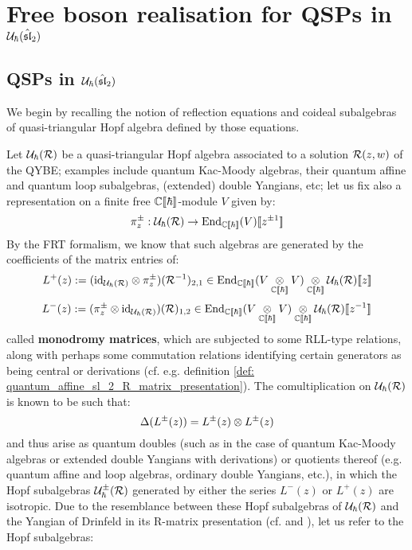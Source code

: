 \section{\texorpdfstring{Free boson realisation for QSPs in $\mathcal{U}_{\hbar}(\hat{\mathfrak{sl}}_2)$}{}}
    \subsection{\texorpdfstring{QSPs in $\mathcal{U}_{\hbar}(\hat{\mathfrak{sl}}_2)$}{}}
        We begin by recalling the notion of reflection equations and coideal subalgebras of quasi-triangular Hopf algebra defined by those equations.
        
        Let $\mathcal{U}_{\hbar}(\mathcal{R})$ be a quasi-triangular Hopf algebra associated to a solution $\mathcal{R}(z, w)$ of the QYBE; examples include quantum Kac-Moody algebras, their quantum affine and quantum loop subalgebras, (extended) double Yangians, etc; let us fix also a representation on a finite free $\mathbb{C}[\![\hbar]\!]$-module $V$ given by:
            $$\pi_z^{\pm}: \mathcal{U}_{\hbar}(\mathcal{R}) \to \operatorname{End}_{\mathbb{C}[\![\hbar]\!]}(V)[\![z^{\pm 1}]\!]$$
        By the FRT formalism, we know that such algebras are generated by the coefficients of the matrix entries of:
            $$L^+(z) := (\id_{\calU_{\hbar}(\calR)} \tensor \pi_z^{\pm})( \calR^{-1} )_{2, 1} \in \End_{\bbC[\![\hbar]\!]}(V \tensor_{\bbC[\![\hbar]\!]} V) \tensor_{\bbC[\![\hbar]\!]} \calU_{\hbar}(\calR)[\![z]\!]$$
            $$L^-(z) := (\pi_z^{\pm} \tensor \id_{\calU_{\hbar}(\calR)})( \calR )_{1, 2} \in \End_{\bbC[\![\hbar]\!]}(V \tensor_{\bbC[\![\hbar]\!]} V) \tensor_{\bbC[\![\hbar]\!]} \calU_{\hbar}(\calR)[\![z^{-1}]\!]$$
        called \textbf{monodromy matrices}, which are subjected to some RLL-type relations, along with perhaps some commutation relations identifying certain generators as being central or derivations (cf. e.g. definition \ref{def: quantum_affine_sl_2_R_matrix_presentation}). The comultiplication on $\mathcal{U}_{\hbar}(\mathcal{R})$ is known to be such that:
            $$\Delta( L^{\pm}(z) ) = L^{\pm}(z) \tensor L^{\pm}(z)$$
        and thus arise as quantum doubles (such as in the case of quantum Kac-Moody algebras or extended double Yangians with derivations) or quotients thereof (e.g. quantum affine and loop algebras, ordinary double Yangians, etc.), in which the Hopf subalgebras $\mathcal{U}_{\hbar}^{\pm}(\mathcal{R})$ generated by either the series $L^-(z)$ or $L^+(z)$ are isotropic. Due to the resemblance between these Hopf subalgebras of $\mathcal{U}_{\hbar}(\mathcal{R})$ and the Yangian of Drinfeld in its R-matrix presentation (cf. \cite{drinfeld_original_yangian_paper} and \cite[Chapter 1]{molev_yangians_and_classical_lie_algebras}), let us refer to the Hopf subalgebras:
